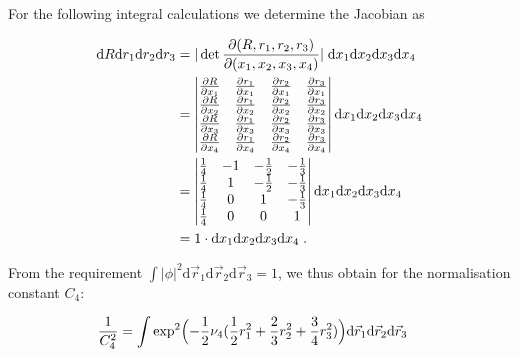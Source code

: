 \documentclass[a4paper,11pt]{scrartcl}
\begin{document}
\begin{appendix}
\noindent For the following integral calculations we determine the Jacobian as

\begin{align}
	\mathrm{d}R\mathrm{d}r_{1}\mathrm{d}r_{2}\mathrm{d}r_{3} &= \vert\det {\partial(R,r_{1},r_{2},r_{3}) \over \partial(x_{1},x_{2},x_{3},x_{4})}\vert \; \mathrm{d}x_{1}\mathrm{d}x_{2}\mathrm{d}x_{3}\mathrm{d}x_{4} \\
		&= \begin{vmatrix} {\partial R \over \partial x_{1}} & {\partial r_{1} \over \partial x_{1}} & {\partial r_{2} \over \partial x_{1}}& {\partial r_{3} \over \partial x_{1}} \\ 
		{\partial R \over \partial x_{2}} & {\partial r_{1} \over \partial x_{2}} & {\partial r_{2} \over \partial x_{2}}& {\partial r_{3} \over \partial x_{2}} \\ 
		{\partial R \over \partial x_{3}} & {\partial r_{1} \over \partial x_{3}} & {\partial r_{2} \over \partial x_{3}}& {\partial r_{3} \over \partial x_{3}} \\ 
		{\partial R \over \partial x_{4}} & {\partial r_{1} \over \partial x_{4}} & {\partial r_{2} \over \partial x_{4}}& {\partial r_{3} \over \partial x_{4}} \end{vmatrix} 
		\mathrm{d}x_{1}\mathrm{d}x_{2}\mathrm{d}x_{3}\mathrm{d}x_{4} \\
		&=  \begin{vmatrix} {1\over 4} & -1 & -{1\over 2} & -{1\over 3}  \\
			{1\over 4} & 1 & -{1\over 2} & -{1\over 3}  \\
			{1\over 4} & 0 & 1 & -{1\over 3}  \\
			{1\over 4} & 0 & 0 & 1
			 \end{vmatrix} \mathrm{d}x_{1}\mathrm{d}x_{2}\mathrm{d}x_{3}\mathrm{d}x_{4} \\
		&= 1 \cdot \mathrm{d}x_{1}\mathrm{d}x_{2}\mathrm{d}x_{3}\mathrm{d}x_{4} \; .
\end{align}

\noindent From the requirement $\int|\phi|^2\mathrm{d}\vec{r}_{1}\mathrm{d}\vec{r}_{2}\mathrm{d}\vec{r}_{3} = 1$, we thus obtain for the normalisation constant $C_4$: 

\begin{align}
	{1\over C_{4}^{2}} &= \int \exp^{2}\Bigl(-{1\over 2} \nu_{4} ({1\over 2}r_{1}^{2} + {2\over 3} r_{2}^{2} + {3\over 4}r_{3}^{2}) \Bigr) \mathrm{d}\vec{r}_{1}\mathrm{d}\vec{r}_{2}\mathrm{d}\vec{r}_{3}
\end{align}


\end{appendix}
\end{document}
